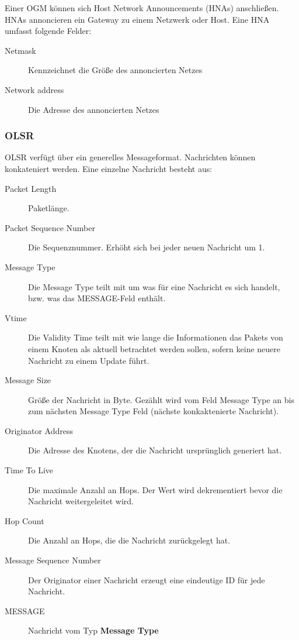 \documentclass[a4paper,10pt]{article}
\begin{document}
Einer OGM können sich Host Network Announcements (HNAs) anschließen. 
HNAs annoncieren ein Gateway zu einem Netzwerk oder Host.
Eine HNA umfasst folgende Felder: 

\begin{description}
  \item[Netmask] Kennzeichnet die Größe des annoncierten Netzes
  \item[Network address] Die Adresse des annoncierten Netzes
\end{description}


\subsubsection*{OLSR}

OLSR verfügt über ein generelles Messageformat.
Nachrichten können konkateniert werden.
Eine einzelne Nachricht besteht aus:

\begin{description}
  \item[Packet Length] Paketlänge.
  \item[Packet Sequence Number] Die Sequenznummer. Erhöht sich bei jeder neuen Nachricht um 1. 
  \item[Message Type] Die Message Type teilt mit um was für eine Nachricht es sich handelt, bzw. was das MESSAGE-Feld enthält.
  \item[Vtime] Die Validity Time teilt mit wie lange die Informationen das Pakets von einem Knoten als aktuell betrachtet werden sollen, sofern keine neuere Nachricht zu einem Update führt.
  \item[Message Size] Größe der Nachricht in Byte. Gezählt wird vom Feld Message Type an bis zum nächsten Message Type Feld (nächste konkaktenierte Nachricht).
  \item[Originator Address] Die Adresse des Knotens, der die Nachricht ursprünglich generiert hat.
  \item[Time To Live] Die maximale Anzahl an Hops. Der Wert wird dekrementiert bevor die Nachricht weitergeleitet wird.
  \item[Hop Count] Die Anzahl an Hops, die die Nachricht zurückgelegt hat.
  \item[Message Sequence Number] Der Originator einer Nachricht erzeugt eine eindeutige ID für jede Nachricht.
  \item[MESSAGE] Nachricht vom Typ \textbf{Message Type}
\end{description}
\end{document}
